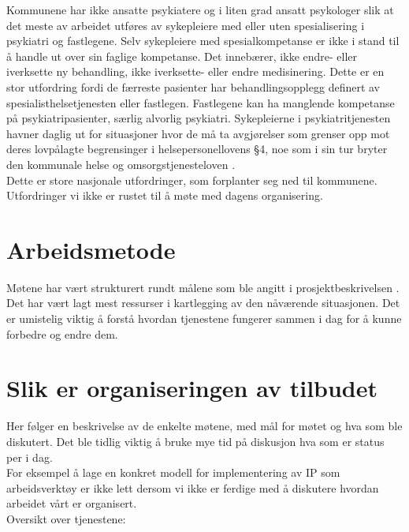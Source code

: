 \documentclass[11pt]{report} %
\begin{document}
                    Kommunene har ikke ansatte psykiatere og i liten grad ansatt psykologer slik at det meste av arbeidet utføres av sykepleiere med eller uten spesialisering i psykiatri og fastlegene. Selv sykepleiere med spesialkompetanse er ikke i stand til å handle ut over sin faglige kompetanse. Det innebærer, ikke endre- eller iverksette ny behandling, ikke iverksette- eller endre medisinering. Dette er en stor utfordring fordi de færreste pasienter har behandlingsopplegg definert av spesialisthelsetjenesten eller fastlegen. Fastlegene kan ha manglende kompetanse på psykiatripasienter, særlig alvorlig psykiatri. 
                    Sykepleierne i psykiatritjenesten havner daglig ut for situasjoner hvor de må ta avgjørelser som grenser opp mot deres lovpålagte begrensinger i helsepersonellovens §4, noe som i sin tur bryter den kommunale helse og omsorgstjenesteloven
                    \cite{HOTJL-12}.\\
                    Dette er store nasjonale utfordringer, som forplanter seg ned til kommunene. Utfordringer vi ikke er rustet til å møte med dagens organisering. \\

                \chapter{Arbeidsmetode}\label{chap:meto}
                  Møtene har vært strukturert rundt målene som ble angitt i prosjektbeskrivelsen
                  \cite{ProPlan-1}. Det har vært lagt mest ressurser i kartlegging av den nåværende situasjonen. Det er umistelig viktig å forstå hvordan tjenestene fungerer sammen i dag for å kunne forbedre og endre dem.\\

                \chapter{Slik er organiseringen av tilbudet}\label{chap:org}
                  Her følger en beskrivelse av de enkelte møtene, med mål for møtet og hva som ble diskutert. Det ble tidlig viktig å bruke mye tid på diskusjon hva som er status per i dag.\\
                  For eksempel å lage en konkret modell for implementering av IP som arbeidsverktøy er ikke lett dersom vi ikke er ferdige med å diskutere hvordan arbeidet vårt er organisert.\\
                  Oversikt over tjenestene:\\
                   
\end{document}
